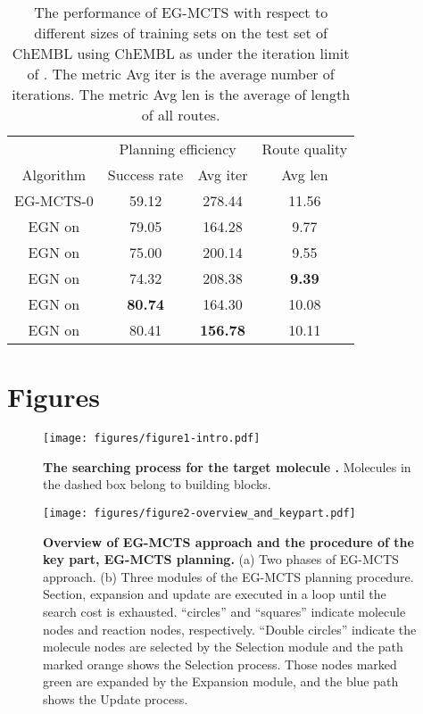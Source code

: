 \documentclass[sn-mathphys,Numbered]{sn-jnl}
\begin{document}
\begin{table}[!ht]
    \caption{The performance of EG-MCTS with respect to different sizes of training sets on the test set of ChEMBL using ChEMBL as  under the iteration limit of . The metric Avg iter is the average number of iterations. The metric Avg len is the average of length of all routes.}
    \label{table-trainsize}
    \centering
    \begin{tabular}{cccc}
            \toprule
            & \multicolumn{2}{c}{Planning efficiency }   & \multicolumn{1}{c}{Route quality}             \\
            \cmidrule(r){2-3} \cmidrule(r){4-4} 
             Algorithm & Success rate & Avg iter & Avg len\\
             \midrule
            EG-MCTS-0 & 59.12 & 278.44  & 11.56\\
             EGN on  & 79.05 & 164.28  & 9.77\\
             EGN on  & 75.00 & 200.14  & 9.55\\
             
             EGN on  &  74.32   & 208.38   & \textbf{9.39} \\
             EGN on  &  \textbf{80.74}  & 164.30   & 10.08 \\
             EGN on  & 80.41 & \textbf{156.78}  & 10.11\\
             \bottomrule
        \end{tabular}

\end{table}

\clearpage
\section{Figures}

\begin{figure*}[!ht]
\centering
\texttt{[image: figures/figure1-intro.pdf]}
\caption{\textbf{The searching process for the target molecule .} Molecules in the dashed box belong to building blocks.}
\label{figure1-intro}
\end{figure*}

\begin{figure*}[!ht]
\centering
\texttt{[image: figures/figure2-overview\_and\_keypart.pdf]}
\caption{\textbf{Overview of EG-MCTS approach and the procedure of the key part, EG-MCTS planning. }(a) Two phases of EG-MCTS approach. (b) Three modules of the EG-MCTS planning procedure. Section, expansion and update are executed in a loop until the search cost is exhausted. ``circles'' and ``squares'' indicate molecule nodes and reaction nodes, respectively. ``Double circles'' indicate the molecule nodes are selected by the Selection module and the path marked orange shows the Selection process. Those nodes marked green are expanded by the Expansion module, and the blue path shows the Update process. }
\label{figure2-overview_and_keypart}
\end{figure*}
\end{document}
